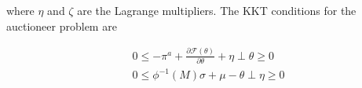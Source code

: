 \documentclass[11pt, letterpaper]{article}
\begin{document}
\begin{appendices}
where $\eta$ and $\zeta$ are the Lagrange multipliers. The KKT conditions for the auctioneer problem are

\begin{align}
    & 0 \leq -\pi^{a}+ \frac{\partial \mathcal{F}(\theta)}{\partial \theta} +\eta \perp \theta \geq 0 \\
    & 0 \leq \phi^{-1}(M) \sigma+ \mu - \theta  \perp \eta \geq 0
\end{align}

\end{appendices}
\end{document}
